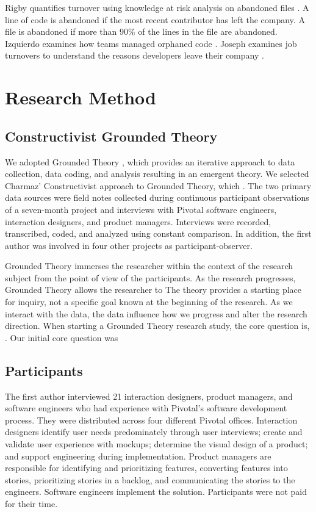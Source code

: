 Rigby quantifies turnover using knowledge at risk analysis on abandoned files  \cite{Rigby2016Turnover}. A line of code is abandoned if the most recent contributor has left the company.  A file is abandoned if more than 90\% of the lines in the file are abandoned.  Izquierdo examines how teams managed orphaned code \cite{Izquierdo2009Turnover}. Joseph examines job turnovers to understand the reasons developers leave their company  \cite{Joseph2007Turnover}.  
\section{Research Method}
\label{ResearchMethod}
\subsection{Constructivist Grounded Theory}

We adopted Grounded Theory \cite{Charmaz}, which provides an iterative approach to data collection, data coding, and analysis resulting in an emergent theory. We selected Charmaz' Constructivist approach to Grounded Theory, which  \cite{StolGTinSE}. The two primary data sources were field notes collected during continuous participant observations of a seven-month project and interviews with Pivotal software engineers, interaction designers, and product managers. Interviews were recorded, transcribed, coded, and analyzed using constant comparison. In addition, the first author was involved in four other projects as participant-observer.

Grounded Theory immerses the researcher within the context of the research subject from the point of view of the participants. As the research progresses, Grounded Theory allows the researcher to  The theory provides a starting place for inquiry, not a specific goal known at the beginning of the research. As we interact with the data, the data influence how we progress and alter the research direction. When starting a Grounded Theory research study, the core question is,  \cite{GlaserTheoreticalSensitivity}. Our initial core question was 
\subsection{Participants}
The first author interviewed 21 interaction designers, product managers, and software engineers who had experience with Pivotal's software development process. They were distributed across four different Pivotal offices. Interaction designers identify user needs predominately through user interviews; create and validate user experience with mockups; determine the visual design of a product; and support engineering during implementation. Product managers are responsible for identifying and prioritizing features, converting features into stories, prioritizing stories in a backlog, and communicating the stories to the engineers. Software engineers implement the solution. Participants were not paid for their time. 

